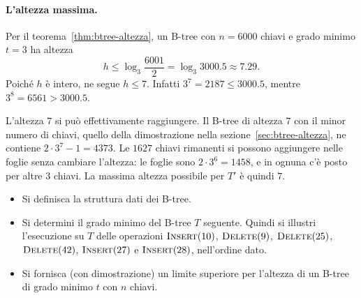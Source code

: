 \paragraph{L'altezza massima.}
Per il teorema~\ref{thm:btree-altezza}, un B-tree con $n = 6000$ chiavi e grado minimo $t = 3$ ha altezza
\[
h \le \log_3 \frac{6001}{2} = \log_3 3000.5 \approx 7.29.
\]
Poiché $h$ è intero, ne segue $h \le 7$. Infatti $3^7 = 2187 \le 3000.5$, mentre $3^8 = 6561 > 3000.5$.

L'altezza $7$ si può effettivamente raggiungere. Il B-tree di altezza $7$ con il minor numero di chiavi, quello della dimostrazione nella sezione~\ref{sec:btree-altezza}, ne contiene $2 \cdot 3^7 - 1 = 4373$. Le $1627$ chiavi rimanenti si possono aggiungere nelle foglie senza cambiare l'altezza: le foglie sono $2 \cdot 3^6 = 1458$, e in ognuna c'è posto per altre $3$ chiavi. La massima altezza possibile per $T'$ è quindi $7$.

\begin{esercizio}\label{es:btree-2025}
\begin{itemize}
    \item[(1)] Si definisca la struttura dati dei B-tree.
    \item[(2)] Si determini il grado minimo del B-tree $T$ seguente. Quindi si illustri l'esecuzione su $T$ delle operazioni $\textsc{Insert}(10)$, $\textsc{Delete}(9)$, $\textsc{Delete}(25)$, $\textsc{Delete}(42)$, $\textsc{Insert}(27)$ e $\textsc{Insert}(28)$, nell'ordine dato.
    \item[(3)] Si fornisca (con dimostrazione) un limite superiore per l'altezza di un B-tree di grado minimo $t$ con $n$ chiavi.
\end{itemize}
\begin{center}
\end{center}
\end{esercizio}

